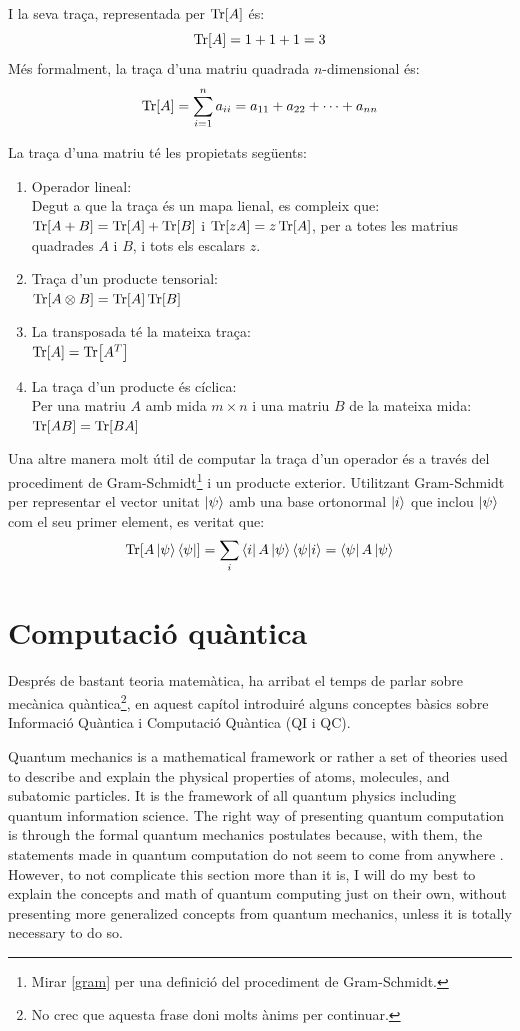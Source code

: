 I la seva traça, representada per $\Tr[A]$ és:
$$
\Tr[A] = 1 + 1 + 1 = 3
$$
Més formalment, la traça d'una matriu quadrada $n$-dimensional és:
$$
\Tr[A] = \sum_{i=1}^{n} a_{ii} = a_{11} + a_{22} + \cdots + a_{nn}
$$

La traça d'una matriu té les propietats següents:
\begin{enumerate}
	\item Operador lineal: \\
	Degut a que la traça és un mapa lienal, es compleix que:\\
	$\Tr[A+B] = \Tr[A] + \Tr[B]$ i $\Tr[zA] = z \Tr[A]$, per a totes les matrius quadrades $A$ i $B$, i tots els escalars $z$.
	\item Traça d'un producte tensorial: \\
	$\Tr[A \otimes B] = \Tr[A]\Tr[B]$
	\item La transposada té la mateixa traça: \\
	$\Tr[A]=\Tr[A^T]$
	\item La traça d'un producte és cíclica: \\
	Per una matriu $A$ amb mida $m \times n$ i una matriu $B$ de la mateixa mida:\\
	$\Tr[AB]=\Tr[BA]$
\end{enumerate}

Una altre manera molt útil de computar la traça d'un operador és a través del procediment de Gram-Schmidt\footnote{Mirar \ref{gram} per una definició del procediment de Gram-Schmidt.} i un producte exterior.
Utilitzant Gram-Schmidt per representar el vector unitat $\ket{\psi}$ amb una base ortonormal $\ket{i}$ que inclou $\ket{\psi}$ com el seu primer element, es veritat que:
$$
\Tr[A\ket{\psi}\bra{\psi}] = \sum_i \bra{i}A\ket{\psi}\bra{\psi}\ket{i} = \bra{\psi}A\ket{\psi}
$$

\chapter{Computació quàntica}
Després de bastant teoria matemàtica, ha arribat el temps de parlar sobre mecànica quàntica\footnote{No crec que aquesta frase doni molts ànims per continuar.}, en aquest capítol introduiré  alguns conceptes bàsics sobre Informació Quàntica i Computació Quàntica (QI i QC).

Quantum mechanics is a mathematical framework or rather a set of theories used to describe and explain the physical properties of atoms, molecules, and subatomic particles. It is the framework of all quantum physics including quantum information science. The right way of presenting quantum computation is through the formal quantum mechanics postulates because, with them, the statements made in quantum computation do not seem to come from anywhere \cite{QCandQI:QM_postulates}. However, to not complicate this section more than it is, I will do my best to explain the concepts and math of quantum computing just on their own, without presenting more generalized concepts from quantum mechanics, unless it is totally necessary to do so.

